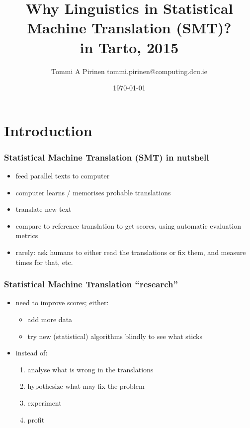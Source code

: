 \documentclass{beamer}
\title{Why Linguistics in Statistical Machine Translation (SMT)?\\
\scriptsize{in Tarto, 2015}}
\author{Tommi A Pirinen \scriptsize \guilsinglleft{}tommi.pirinen@computing.dcu.ie\guilsinglright{}}
\institute{DCU, ADAPT--CNGL\\Abumatran}
\date{\today}
\begin{document}

\maketitle

\section{Introduction}

\begin{frame}
    \frametitle{Statistical Machine Translation (SMT) in nutshell}
    \begin{itemize}
        \item feed parallel texts to computer
        \item computer learns / memorises probable translations
        \item translate new text
        \item compare to reference translation to get scores, using automatic
            evaluation metrics
        \item rarely: ask humans to either read the translations or fix them,
            and measure times for that, etc.
    \end{itemize}
\end{frame}

\begin{frame}
    \frametitle{Statistical Machine Translation ``research''}
    \begin{itemize}
        \item need to improve scores; either:
            \begin{itemize}
                \item add more data
                \item try new (statistical) algorithms blindly to see what sticks
            \end{itemize}
        \item instead of:
            \begin{enumerate}
                \item analyse what is wrong in the translations
                \item hypothesize what may fix the problem
                \item experiment
                \item profit
            \end{enumerate}
    \end{itemize}
\end{frame}
\end{document}
